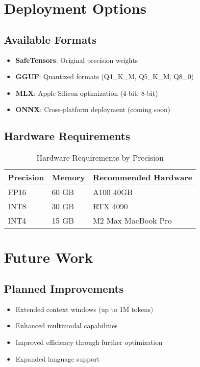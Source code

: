 \documentclass[11pt,a4paper]{article}
\begin{document}
\section{Deployment Options}

\subsection{Available Formats}
\begin{itemize}
    \item \textbf{SafeTensors}: Original precision weights
    \item \textbf{GGUF}: Quantized formats (Q4\_K\_M, Q5\_K\_M, Q8\_0)
    \item \textbf{MLX}: Apple Silicon optimization (4-bit, 8-bit)
    \item \textbf{ONNX}: Cross-platform deployment (coming soon)
\end{itemize}

\subsection{Hardware Requirements}
\begin{table}[H]
\centering
\begin{tabular}{lll}
\toprule
\textbf{Precision} & \textbf{Memory} & \textbf{Recommended Hardware} \\
\midrule
FP16 & 60 GB & A100 40GB \\
INT8 & 30 GB & RTX 4090 \\
INT4 & 15 GB & M2 Max MacBook Pro \\
\bottomrule
\end{tabular}
\caption{Hardware Requirements by Precision}
\end{table}

\section{Future Work}

\subsection{Planned Improvements}
\begin{itemize}
    \item Extended context windows (up to 1M tokens)
    \item Enhanced multimodal capabilities
    \item Improved efficiency through further optimization
    \item Expanded language support
\end{itemize}
\end{document}
